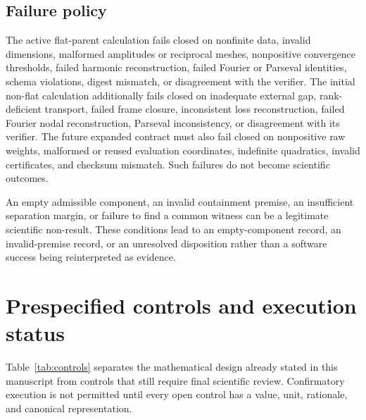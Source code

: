 \documentclass[11pt]{article}
\begin{document}
\subsection{Failure policy}

The active flat-parent calculation fails closed on nonfinite data, invalid dimensions,
malformed amplitudes or reciprocal meshes, nonpositive convergence thresholds, failed
harmonic reconstruction, failed Fourier or Parseval identities, schema violations,
digest mismatch, or disagreement with the verifier. The initial non-flat calculation
additionally fails closed on inadequate external gap, rank-deficient transport, failed
frame closure, inconsistent loss reconstruction, failed Fourier nodal reconstruction,
Parseval inconsistency, or disagreement with its verifier. The future expanded contract
must also fail closed on nonpositive raw weights, malformed or reused evaluation
coordinates, indefinite quadratics, invalid certificates, and checksum mismatch. Such
failures do not become scientific outcomes.

An empty admissible component, an invalid containment premise, an insufficient
separation margin, or failure to find a common witness can be a legitimate scientific
non-result. These conditions lead to an empty-component record, an invalid-premise
record, or an unresolved disposition rather than a software success being reinterpreted
as evidence.

\section{Prespecified controls and execution status}

Table~\ref{tab:controls} separates the mathematical design already stated in this
manuscript from controls that still require final scientific review. Confirmatory
execution is not permitted until every open control has a value, unit, rationale, and
canonical representation.
\end{document}
